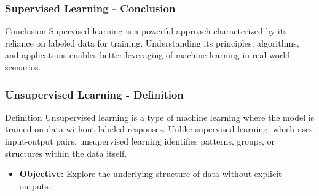 \documentclass[aspectratio=169]{beamer}
\begin{document}
\begin{frame}[fragile]
    \frametitle{Supervised Learning - Conclusion}
    \begin{block}{Conclusion}
        Supervised learning is a powerful approach characterized by its reliance on labeled data for training. Understanding its principles, algorithms, and applications enables better leveraging of machine learning in real-world scenarios.
    \end{block}
\end{frame}

\begin{frame}[fragile]
  \frametitle{Unsupervised Learning - Definition}
  \begin{block}{Definition}
    Unsupervised learning is a type of machine learning where the model is trained on data without labeled responses. Unlike supervised learning, which uses input-output pairs, unsupervised learning identifies patterns, groups, or structures within the data itself.
  \end{block}
  
  \begin{itemize}
    \item \textbf{Objective:} Explore the underlying structure of data without explicit outputs.
  \end{itemize}
\end{frame}
\end{document}
